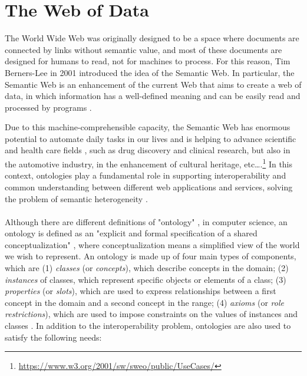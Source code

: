 \section{The Web of Data}
\label{sec:web-of-data}

The World Wide Web was originally designed to be a space where documents are connected by links without semantic value, and most of these documents are designed for humans to read, not for machines to process. For this reason, Tim Berners-Lee in 2001 introduced the idea of the Semantic Web. In particular, the Semantic Web is an enhancement of the current Web that aims to create a web of data, in which information has a well-defined meaning and can be easily read and processed by programs \cite{berners2001semantic}.

Due to this machine-comprehensible capacity, the Semantic Web has enormous potential to automate daily tasks in our lives and is helping to advance scientific and health care fields \cite{feigenbaum2007semantic}, such as drug discovery and clinical research, but also in the automotive industry, in the enhancement of cultural heritage, etc\dots.\footnote{\url{https://www.w3.org/2001/sw/sweo/public/UseCases/}} In this context, ontologies play a fundamental role in supporting interoperability and common understanding between different web applications and services, solving the problem of semantic heterogeneity \cite{taye2010understanding}.

\paragraph*{}
Although there are different definitions of "ontology" \cite{taye2010understanding}, in computer science, an ontology is defined as an "explicit and formal specification of a shared conceptualization" \cite{gruber1995toward}, where conceptualization means a simplified view of the world we wish to represent. An ontology is made up of four main types of components, which are (1) \textit{classes} (or \textit{concepts}), which describe concepts in the domain; (2) \textit{instances} of classes, which represent specific objects or elements of a class; (3) \textit{properties} (or \textit{slots}), which are used to express relationships between a first concept in the domain and a second concept in the range; (4) \textit{axioms} (or \textit{role restrictions}), which are used to impose constraints on the values of instances and classes \cite{taye2010understanding, noy2001ontology}. In addition to the interoperability problem, ontologies are also used to satisfy the following needs:

